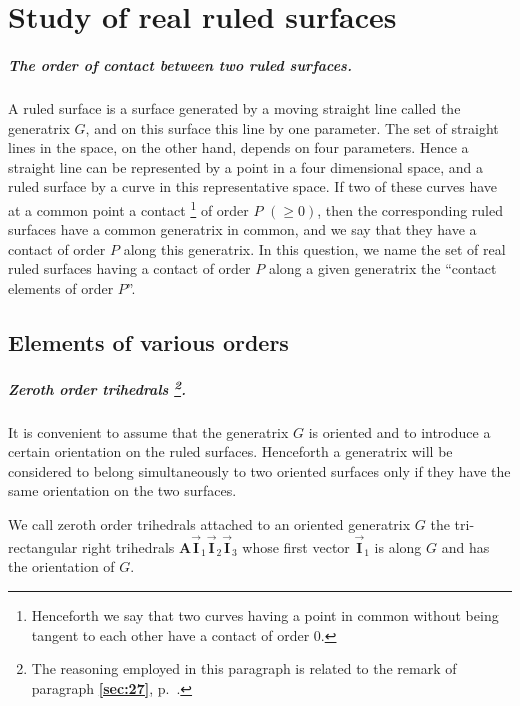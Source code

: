 \documentclass[leqno,11pt]{book}
\numberwithin{equation}{chapter}
\theoremstyle{shape1}
\theoremstyle{shapesmall}
\newcommand{\fsref}[1]{{\rm\textsection\textbf{\ref{sec:#1}}}}
\newcommand{\rvec}[1]{\vec{\mathbf{#1}}}
\newcommand{\ivec}{\rvec{I}}
\begin{document}
\chapter{Study of real ruled surfaces}
\label{cha:study-real-ruled}
\paragraph{The order of contact between two ruled surfaces.}
\label{sec:43}
A ruled surface is a surface generated by a moving straight line called the generatrix $G$, and on this surface this line by one parameter. The set of straight lines in the space, on the other hand, depends on four parameters. Hence a straight line can be represented by a point in a four dimensional space, and a ruled surface by a curve in this representative space. If two of these curves have at a common point a contact \footnote{Henceforth we say that two curves having a point in common without being tangent to each other have a contact of order $0$.} of order $P$ $(\ge 0)$, then the corresponding ruled surfaces have a common generatrix in common, and we say that they have a contact of order $P$ along this generatrix. In this question, we name the set of real ruled surfaces having a contact of order $P$ along a given generatrix the ``contact elements of order $P$''.


\section{Elements of various orders}
\label{sec:elem-vari-orders}

\paragraph[{Zeroth order trihedrals.} ]{Zeroth order trihedrals \footnote{The reasoning employed in this paragraph is related to the remark of paragraph \fsref{27}, p.~\pageref{sec:27}.}.} 
\label{sec:44}
It is convenient to assume that the generatrix $G$ is oriented and to introduce a certain orientation on the ruled surfaces. Henceforth a generatrix will be considered to belong simultaneously to two oriented surfaces only if they have the same orientation on the two surfaces.

We call zeroth order trihedrals attached to an oriented generatrix $G$ the tri-rectangular right trihedrals $\mathbf{A}\ivec_{1}\ivec_{2}\ivec_{3}$ whose first vector $\ivec_{1}$ is along $G$ and has the orientation of $G$.
\end{document}
